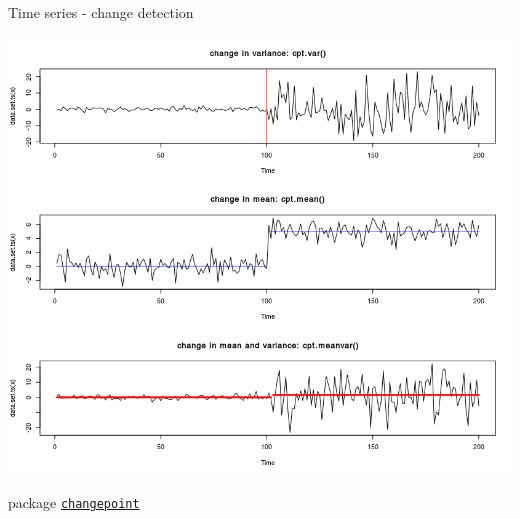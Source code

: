 \documentclass[8pt,ignorenonframetext,]{beamer}
\begin{document}
\begin{frame}[fragile]{Time series - change detection}

\includegraphics{imgPres/TS_changedetection.png}

package
\href{https://cran.r-project.org/web/packages/changepoint}{\texttt{changepoint}}

\end{frame}
\end{document}
